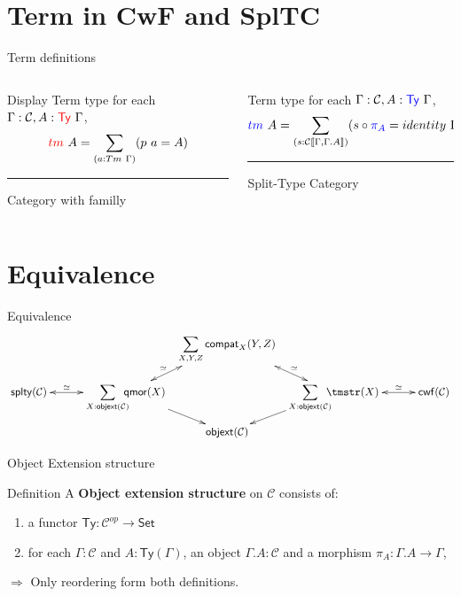 \documentclass[
  ignorenonframetext,
  aspectratio=169,
  usenames,
  dvipsnames
]{beamer}
\newcommand{\defemph}[1]{\textbf{#1}}
\newcommand{\constfont}[1]{\ensuremath{\mathsf{#1}}}
\newcommand{\CC}{{\mathcal{C}}}
\newcommand{\Ty}{\constfont{Ty}}
\newcommand{\set}{\ensuremath{\constfont{Set}}\xspace}
\newcommand{\Tymap}[1]{\ensuremath{\Ty({#1})}}
\newcommand{\compext}[2]{\ensuremath{{#1}.{#2}}}
\newcommand{\deppr}[1]{\constfont{\pi}_{#1}}
\newcommand{\stype}{\constfont{splty}}
\newcommand{\cwf}{\constfont{cwf}}
\newcommand{\compat}{\constfont{compat}}
\newcommand{\qmor}{\constfont{qmor}}
\newcommand{\objext}{\constfont{objext}}
\begin{document}
\section{Term in CwF and SplTC}
\begin{frame}{Term definitions}
    \begin{columns}[T] %
        \begin{column}{.50\textwidth}
        \begin{block}{Display Term type}
            for each $\Gamma : \CC, A : \color{red}\Ty\ \color{black}\Gamma$, $$\color{red} tm \color{black}\ A = \sum_{(a : Tm\ \Gamma)} (p\ a = A)$$
        \end{block}
        \color{red}\rule{\linewidth}{4pt}
        Category with familly
        \end{column}%
        \hfill%
        \begin{column}{.50\textwidth}
        \begin{block}{Term type}
            for each $\Gamma : \CC, A : \color{blue}\Ty\ \color{black} \Gamma$, $$\color{blue}tm\color{black}\ A = \sum_{(s : \CC \llbracket \Gamma,\compext{\Gamma}{A} \rrbracket)} (s \circ \color{blue} \deppr{A} \color{black}= identity\ \Gamma)$$
        \end{block}
        \color{blue}\rule{\linewidth}{4pt}
        Split-Type Category
        \end{column}%
        \end{columns}
\end{frame}

\section{Equivalence}
\begin{frame}{Equivalence}
\[ \xymatrix@C=0.5 pc@R=3ex{
   & & & & \displaystyle \sum_{X,Y,Z} \compat_X(Y,Z) \ar@{<->}[ld]_-{\simeq} \ar@{<->}[rd]^-{\simeq}
   \\
   \stype(\CC) \ar@{<->}[rrr]^-{\simeq}
   & & & \displaystyle \sum_{X : \objext(\CC)} \!\!\!\! \qmor(X) \ar[dr]
   &
   & \displaystyle \sum_{X : \objext(\CC)} \!\!\!\! \tmstr(X) \ar[dl] \ar@{<->}[rrr]^-{\simeq}
   & & & \cwf(\CC)
   \\
   & & & & \objext(\CC)
} \]
\end{frame}

\begin{frame}{Object Extension structure}
  \begin{block}{Definition}
      A \defemph{Object extension structure} on $\CC$ consists of:
      \begin{enumerate}
        \item a functor $\Ty : \CC^{op} \rightarrow \set$
        \item for each $\Gamma : \CC$ and $A : \Tymap{\Gamma}$, an object $\compext{\Gamma}{A} : \CC$
         and a morphism $\deppr{A} : \compext{\Gamma}{A} \to \Gamma$,
      \end{enumerate}
    \end{block}  
$\Rightarrow$ Only reordering form both definitions.
\end{frame}
\end{document}
